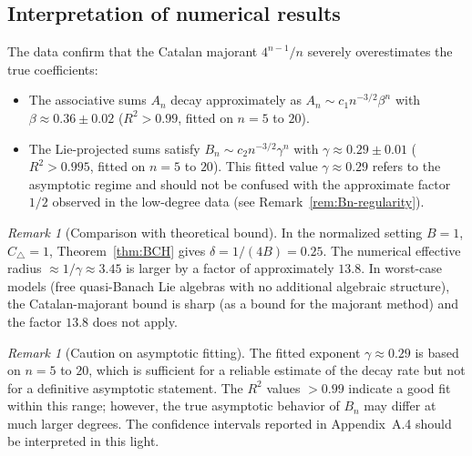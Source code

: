 \documentclass[10pt]{amsart}
\theoremstyle{definition}
\theoremstyle{remark}
\newtheorem{remark}[theorem]{Remark}
\numberwithin{equation}{section}
\newcommand{\Ctri}{C_{\triangle}}    %
\newcommand{\Cbracket}{B}            %
\begin{document}
\subsection{Interpretation of numerical results}

The data confirm that the Catalan majorant $4^{n-1}/n$ severely overestimates the true
coefficients:
\begin{itemize}
    \item The associative sums $A_n$ decay approximately as $A_n \sim c_1 n^{-3/2} \beta^n$
          with $\beta \approx 0.36 \pm 0.02$ ($R^2 > 0.99$, fitted on $n = 5$ to $20$).
    \item The Lie-projected sums satisfy $B_n \sim c_2 n^{-3/2} \gamma^n$ with
          $\gamma \approx 0.29 \pm 0.01$ ($R^2 > 0.995$, fitted on $n = 5$ to $20$).
          This fitted value $\gamma \approx 0.29$ refers to the asymptotic regime and
          should not be confused with the approximate factor $1/2$ observed in the
          low-degree data (see Remark~\ref{rem:Bn-regularity}).
\end{itemize}

\begin{remark}[Comparison with theoretical bound]\label{rem:numerical-interpretation}
In the normalized setting $\Cbracket=1$, $\Ctri=1$, Theorem~\ref{thm:BCH} gives
$\delta = 1/(4\Cbracket) = 0.25$.  The numerical effective radius $\approx 1/\gamma
\approx 3.45$ is larger by a factor of approximately $13.8$.  In worst-case models (free
quasi-Banach Lie algebras with no additional algebraic structure), the Catalan-majorant
bound is sharp (as a bound for the majorant method) and the factor $13.8$ does not apply.
\end{remark}

\begin{remark}[Caution on asymptotic fitting]
The fitted exponent $\gamma \approx 0.29$ is based on $n = 5$ to $20$, which is
sufficient for a reliable estimate of the decay rate but not for a definitive asymptotic
statement.  The $R^2$ values $> 0.99$ indicate a good fit within this range; however,
the true asymptotic behavior of $B_n$ may differ at much larger degrees.  The confidence
intervals reported in Appendix~A.4 should be interpreted in this light.
\end{remark}
\end{document}
